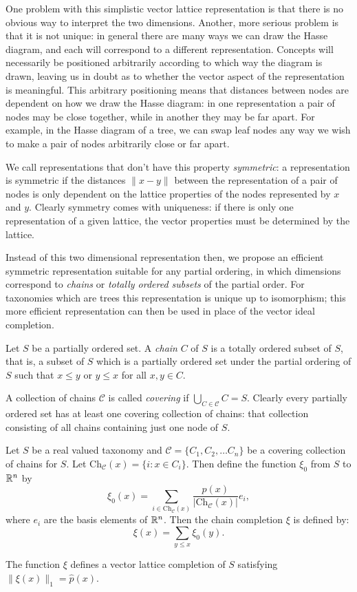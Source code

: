 One problem with this simplistic vector lattice representation is that there is no obvious way to interpret the two dimensions. Another, more serious problem is that it is not unique: in general there are many ways we can draw the Hasse diagram, and each will correspond to a different representation. Concepts will necessarily be positioned arbitrarily according to which way the diagram is drawn, leaving us in doubt as to whether the vector aspect of the representation is meaningful. This arbitrary positioning means that distances between nodes are dependent on how we draw the Hasse diagram: in one representation a pair of nodes may be close together, while in another they may be far apart. For example, in the Hasse diagram of a tree, we can swap leaf nodes any way we wish to make a pair of nodes arbitrarily close or far apart.

We call representations that don't have this property \emph{symmetric}: a representation is symmetric if the distances $\|x - y\|$ between the representation of a pair of nodes is only dependent on the lattice properties of the nodes represented by $x$ and $y$. Clearly symmetry comes with uniqueness: if there is only one representation of a given lattice, the vector properties must be determined by the lattice.

Instead of this two dimensional representation then, we propose an efficient symmetric representation suitable for any partial ordering, in which dimensions correspond to \emph{chains} or \emph{totally ordered subsets} of the partial order. For taxonomies which are trees this representation is unique up to isomorphism; this more efficient representation can then be used in place of the vector ideal completion.

\begin{defn}[Chains]
Let $S$ be a partially ordered set. A \emph{chain} $C$ of $S$ is a totally ordered subset of $S$, that is, a subset of $S$ which is a partially ordered set under the partial ordering of $S$ such that $x \le y$ or $y \le x$ for all $x,y \in C$.

A collection of chains $\mathcal{C}$ is called \emph{covering} if $\bigcup_{C\in \mathcal{C}} C = S$. Clearly every partially ordered set has at least one covering collection of chains: that collection consisting of all chains containing just one node of $S$.
\end{defn}

\begin{defn}
\newcommand{\Ch}{\mathrm{Ch}_\mathcal{C}}
Let $S$ be a real valued taxonomy and $\mathcal{C} = \{C_1, C_2, \ldots C_n\}$ be a covering collection of chains for $S$. Let $\Ch(x) = \{i : x \in C_i\}.$ Then define the function $\xi_0$ from $S$ to $\mathbb{R}^n$ by
$$\xi_0(x) =  \sum_{i \in \Ch(x)} \frac{p(x)}{|\Ch(x)|}e_i,$$
where $e_i$ are the basis elements of $\mathbb{R}^n$. Then the chain completion $\xi$ is defined by:
$$\xi(x) = \sum_{y \le x} \xi_0(y).$$
\end{defn}
\begin{prop}
The function $\xi$ defines a vector lattice completion of $S$ satisfying $\|\xi(x)\|_1 = \hat{p}(x)$.
\end{prop}

